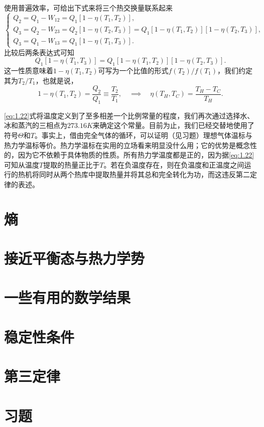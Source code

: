 
	使用普遍效率，可给出下式来将三个热交换量联系起来
	\begin{equation*}
		\left\{
			\begin{aligned}
				Q_2=Q_1-W_{12}=Q_1[1-\eta(T_1,T_2)],\\
				Q_3=Q_2-W_{23}=Q_2[1-\eta(T_2,T_3)]=Q_1[1-\eta(T_1,T_2)][1-\eta(T_2,T_3)],\\
				Q_3=Q_1-W_{13}=Q_1[1-\eta(T_1,T_3)].
			\end{aligned}
		\right.
	\end{equation*}
	比较后两条表达式可知
	\begin{equation}
		Q_1[1-\eta(T_1,T_3)]=Q_1[1-\eta(T_1,T_2)][1-\eta(T_2,T_3)].
	\end{equation}
	这一性质意味着\(1-\eta(T_1,T_2)\)可写为一个比值的形式\(f(T_2)/f(T_1)\)，我们约定其为\(T_2/T_1\)，也就是说，
	\begin{equation}\label{eq:1.22}
		1-\eta(T_1,T_2)=\frac{Q_2}{Q_1}\equiv\frac{T_2}{T_1},
		\quad\implies\quad
		\eta(T_H,T_C)=\frac{T_H-T_C}{T_H}.
	\end{equation}

	\ref{eq:1.22}式将温度定义到了至多相差一个比例常量的程度，我们再次通过选择水、冰和蒸汽的三相点为$273.16K$来确定这个常量。目前为止，我们已经交替地使用了符号$\Theta$和$T$。事实上，借由完全气体的\carnot 循环，可以证明（见习题）理想气体温标与热力学温标等价。热力学温标在实用的立场看来明显没什么用；它的优势是概念性的，因为它不依赖于具体物质的性质。所有热力学温度都是正的，因为据\ref{eq:1.22}可知从温度$T$提取的热量正比于$T$。若在负温度存在，则在负温度和正温度之间运行的热机将同时从两个热库中提取热量并将其总和完全转化为功，而这违反第二定律的\kelvin 表述。

\section{熵}
	

\section{接近平衡态与热力学势}
\section{一些有用的数学结果}
\section{稳定性条件}
\section{第三定律}
\section*{习题}